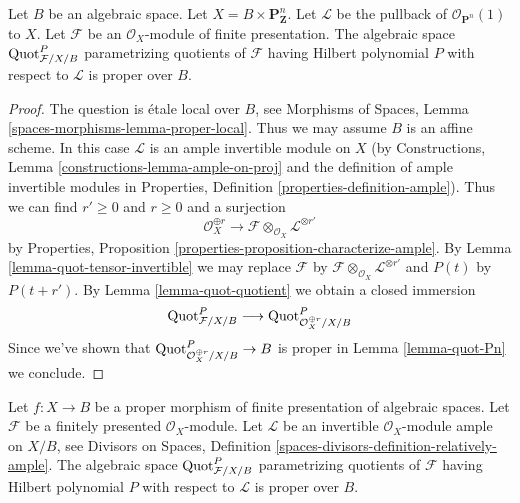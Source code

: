 \begin{lemma}
\label{lemma-quot-Pn-over-base}
Let $B$ be an algebraic space. Let $X = B \times \mathbf{P}^n_\mathbf{Z}$.
Let $\mathcal{L}$ be the pullback of $\mathcal{O}_{\mathbf{P}^n}(1)$ to $X$.
Let $\mathcal{F}$ be an $\mathcal{O}_X$-module of finite
presentation. The algebraic space $\mathrm{Quot}^P_{\mathcal{F}/X/B}$
parametrizing quotients of $\mathcal{F}$
having Hilbert polynomial $P$ with respect to $\mathcal{L}$
is proper over $B$.
\end{lemma}

\begin{proof}
The question is \'etale local over $B$, see
Morphisms of Spaces, Lemma \ref{spaces-morphisms-lemma-proper-local}.
Thus we may assume $B$ is an affine scheme.
In this case $\mathcal{L}$ is an ample invertible module on $X$
(by Constructions, Lemma \ref{constructions-lemma-ample-on-proj}
and the definition of ample invertible modules in
Properties, Definition \ref{properties-definition-ample}).
Thus we can find $r' \geq 0$ and $r \geq 0$ and a surjection
$$
\mathcal{O}_X^{\oplus r} \longrightarrow
\mathcal{F} \otimes_{\mathcal{O}_X} \mathcal{L}^{\otimes r'}
$$
by Properties, Proposition \ref{properties-proposition-characterize-ample}.
By Lemma \ref{lemma-quot-tensor-invertible}
we may replace $\mathcal{F}$ by
$\mathcal{F} \otimes_{\mathcal{O}_X} \mathcal{L}^{\otimes r'}$
and $P(t)$ by $P(t + r')$.
By Lemma \ref{lemma-quot-quotient}
we obtain a closed immersion
$$
\mathrm{Quot}^P_{\mathcal{F}/X/B}
\longrightarrow
\mathrm{Quot}^P_{\mathcal{O}_X^{\oplus r}/X/B}
$$
Since we've shown that $\mathrm{Quot}^P_{\mathcal{O}_X^{\oplus r}/X/B} \to B$
is proper in Lemma \ref{lemma-quot-Pn} we conclude.
\end{proof}

\begin{lemma}
\label{lemma-quot-proper-over-base}
Let $f : X \to B$ be a proper morphism of finite presentation
of algebraic spaces. Let $\mathcal{F}$ be a finitely presented
$\mathcal{O}_X$-module. Let $\mathcal{L}$ be an invertible
$\mathcal{O}_X$-module ample on $X/B$, see
Divisors on Spaces, Definition
\ref{spaces-divisors-definition-relatively-ample}.
The algebraic space $\mathrm{Quot}^P_{\mathcal{F}/X/B}$
parametrizing quotients of $\mathcal{F}$
having Hilbert polynomial $P$ with respect to $\mathcal{L}$
is proper over $B$.
\end{lemma}

